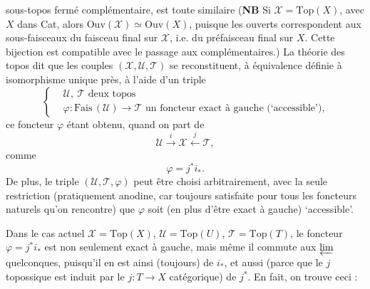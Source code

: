 sous-topos fermé complémentaire, est toute similaire (\textbf{NB} Si $\mathcal{X} = \mathrm{Top}(X)$, avec $X$ dans Cat, alors $\mathrm{Ouv}(\mathcal{X}) \simeq \mathrm{Ouv}(X)$, puisque les ouverts correspondent aux sous-faisceaux du faisceau final sur $\mathcal{X}$, i.e. du préfaisceau final sur $X$. Cette bijection est compatible avec le passage aux complémentaires.) La théorie des topos dit que les couples $(\mathcal{X},\mathcal{U},\mathcal{T})$ se reconstituent, à équivalence définie à isomorphisme unique près, à l'aide d'un triple
\[
\left\{\begin{aligned}
&\mathcal{U},\ \mathcal{T} \text{ deux topos}\\[1ex]
&\varphi : \mathrm{Fais}\,(\mathcal{U}) \longrightarrow \mathcal{T} \text{ un foncteur exact à gauche (`accessible'),}
\end{aligned}\right.
\]
ce foncteur $\varphi$ étant obtenu, quand on part de
\[
\mathcal{U} \xrightarrow{\;i\;} \mathcal{X} \xleftarrow{\;j\;} \mathcal{T},
\]
comme
\[
\varphi = j^*i_*.
\]
De plus, le triple $(\mathcal{U},\mathcal{T},\varphi)$ peut être choisi arbitrairement, avec la seule restriction (pratiquement anodine, car toujours satisfaite pour tous les foncteurs naturels qu'on rencontre) que $\varphi$ soit (en plus d'être exact à gauche) `accessible'.

Dans le cas actuel $\mathcal{X} = \mathrm{Top}(X)$, $\mathcal{U} = \mathrm{Top}(U)$, $\mathcal{T} = \mathrm{Top}(T)$, le foncteur $\varphi = j^*i_*$ est non seulement exact à gauche, mais même il commute aux $\varprojlim$ quelconques, puisqu'il en est ainsi (toujours) de $i_*$, et aussi (parce que le $j$ topossique est induit par le $j : T \longrightarrow X$ catégorique) de $j^*$. En fait, on
trouve ceci :

